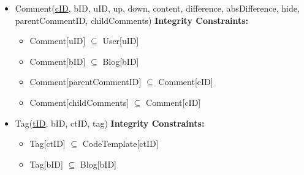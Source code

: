 \documentclass{article}
\begin{document}
\begin{itemize}
\break
\item
Comment(\underline{cID}, bID, uID, up, down, content, difference, absDifference, hide, parentCommentID, childComments)
\textbf{Integrity Constraints:}
\begin{itemize}
\item Comment[uID] $\subseteq$ User[uID]
\item Comment[bID] $\subseteq$ Blog[bID]
\item Comment[parentCommentID] $\subseteq$ Comment[cID]
\item Comment[childComments] $\subseteq$ Comment[cID]
\end{itemize}

\item
Tag(\underline{tID}, bID, ctID, tag)
\textbf{Integrity Constraints:}
\begin{itemize}
\item Tag[ctID] $\subseteq$ CodeTemplate[ctID]
\item Tag[bID] $\subseteq$ Blog[bID]
\end{itemize}

\end{itemize}
\end{document}
